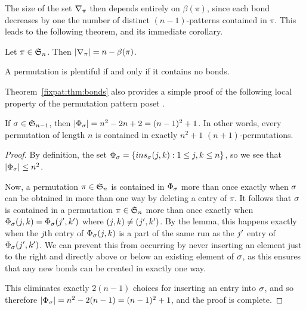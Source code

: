     The size of the set $\delpi$ then depends entirely on $\beta(\pi)$, since
    each bond decreases by one the number of distinct $(n-1)$-patterns
    contained in $\pi$. This leads to the following theorem, and its immediate
    corollary. 

    \begin{theorem} \label{fixpat:thm:bonds}
      Let $\pi \in \S_n$. Then $|\delpi| = n - \beta(\pi)$. 
    \end{theorem}

    \begin{corollary} \label{fixpat:cor:alldistinct}
      A permutation is plentiful if and only if it contains no bonds. 
    \end{corollary}

    Theorem~\ref{fixpat:thm:bonds} also provides a simple proof of the
    following local property of the permutation pattern poset . 

    \begin{corollary} \label{fixpat:cor:n2+1} 
      If $\sg \in \S_{n-1}$, then $|\ins_\sg| = n^2 - 2n + 2 = (n-1)^2 + 1$. In
      other words, every permutation of length $n$ is contained in exactly $n^2 +1$
      $(n+1)$-permutations. 
    \end{corollary}
    \begin{proof}

      By definition, the set $\ins_\sg = \{ins_\sg(j,k) : 1 \leq j , k \leq
      n\}$, so we see that $|\ins_\sg| \leq n^2$.

      Now, a permutation $\pi \in \S_n$ is contained in $\ins_\sg$ more than once
      exactly when $\sg$ can be obtained in more than one way by deleting a entry
      of $\pi$. It follows that $\sg$ is contained in a permutation $\pi \in \S_n$
      more than once exactly when $\ins_\sg(j,k) = \ins_\sg(j\p,k\p)$ where
      $(j,k) \neq (j\p,k\p)$. By the lemma, this happens exactly when the $j$th
      entry of
      $\ins_\sg(j,k)$ is a part of the same run as the $j\p$ entry of
      $\ins_\sg(j\p,k\p)$. We can prevent this from occurring by never inserting
      an element just to the right and directly above or below an existing
      element of $\sg$, as this ensures that any new bonds can be created in
      exactly one way. 

      This eliminates exactly $2(n-1)$ choices for inserting an entry into $\sg$,
      and so therefore $|\ins_\sg| = n^2 - 2(n-1) = (n-1)^2 +1$, and the proof
      is complete.  
    \end{proof}

